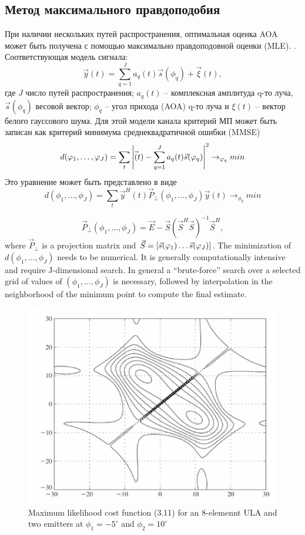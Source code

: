 \subsection{Метод максимального правдоподобия}%
\label{sub:metod_maksimal_nogo_pravdopodobiia}
При наличии нескольких путей распространения, оптимальная оценка AOA может быть
получена с помощью максимально правдоподовной оценки (MLE).
 \cite{Tuncer2009}. Соответствующая модель сигнала:
\begin{equation}
    \label{eq:3.8}
    \vec y(t) = \sum\limits_{q=1}^{J} a_q(t)\vec s(\phi_q) + \vec \xi(t),
\end{equation}
где $J$ число путей распространения; $a_q(t)$ -- комплексная амплитуда q-то
луча, $\vec s(\phi_q)$ весовой вектор;  $\phi_q$ -- угол прихода (AOA) q-то
луча и $\xi(t)$ -- вектор белого гауссового шума. 
Для этой модели канала критерий МП может быть записан как критерий минимума
среднеквадратичной ошибки (MMSE)
 \begin{equation}
    \label{eq:}
    d(\varphi_1, \hdots, \varphi_J) = \sum\limits_{t}^{} \abs{\vec(t) -
    \sum\limits_{q=1}^{J} a_q(t) \vec s(\varphi_q)}^2 \to_{\varphi_q} min
\end{equation}
Это уравнение может быть представлено в виде
\begin{equation}
    \label{eq:}
    d(\phi_1, \hdots, \phi_J) = \sum\limits_{t}^{} \vec y^H(t) \vec
P_\perp(\phi_1, \hdots, \phi_J) \vec y(t) \to_{\phi_q} min
\end{equation}

\begin{equation}
    \label{eq:}
    \vec P_\perp(\phi_1, \hdots, \phi_J) = \vec E - \vec S(\vec S^H \vec S)^{-1}
    \vec S^H,
\end{equation}
where $\vec P_\perp$ is a projection matrix and  $\vec S = \qty[\vec s(\varphi_1)
\dots \vec s (\varphi_J)]$. The minimization of  $d(\phi_1, \hdots, \phi_J)$
needs to be numerical. 
It is generally computationally intensive and require J-dimensional search. In
general a “brute-force” search over a selected grid of values of $(\phi_1,
\hdots, \phi_J)$ is necessary, followed by
interpolation in the neighborhood of the minimum point to compute the final estimate.

\begin{figure}[h]
    \centering
    \includegraphics[width=0.6\linewidth]{figs/fig3.10}
    \caption{Maximum likelihood cost function (3.11) for an 8-elemennt ULA and
    two emitters at $\phi_1=-5^\circ$ and  $\phi_2 = 10^\circ$ \cite{Tuncer2009}}
    \label{fig:3.10}
\end{figure}

